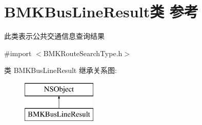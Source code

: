 \hypertarget{interface_b_m_k_bus_line_result}{\section{B\+M\+K\+Bus\+Line\+Result类 参考}
\label{interface_b_m_k_bus_line_result}
}


此类表示公共交通信息查询结果  




{\ttfamily \#import $<$B\+M\+K\+Route\+Search\+Type.\+h$>$}

类 B\+M\+K\+Bus\+Line\+Result 继承关系图\+:\begin{figure}[H]
\begin{center}
\leavevmode
\includegraphics[height=2.000000cm]{interface_b_m_k_bus_line_result}
\end{center}
\end{figure}
